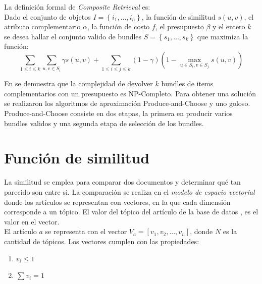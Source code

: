 La definición formal de \textit{Composite Retrieval} es:\\
Dado el conjunto de objetos $I = \left\{i_1, \ldots, i_n \right\}$, la función de similitud $s(u,v)$, el atributo complementario $\alpha$, la función de costo $f$, el presupuesto $\beta$ y el entero $k$ se desea hallar el conjunto valido de bundles $S = \left\{s_1, \ldots, s_k\right\}$ que maximiza la función:
\begin{equation} \label{des:eq-fnObj}
  \sum_{1 \leq i \leq k}{\sum_{u,v \in S_i}{\gamma s(u,v)}} + \sum_{1 \leq i \leq j \leq k}{(1-\gamma) (1-\max_{u \in S_i, v \in S_j}{s(u,v)})}
\end{equation}

En \cite{compositeRetrival} se demuestra que la complejidad de devolver $k$ bundles de items complementarios con un presupuesto es NP-Completo. Para obtener una solución se realizaron los algoritmos de aproximación Produce-and-Choose y uno goloso. Produce-and-Choose consiste en dos etapas, la primera en producir varios bundles validos y una segunda etapa de selección de los bundles.

\section{Función de similitud}
La similitud se emplea para comparar dos documentos y determinar qué tan parecido son entre si. La comparación se realiza en el \textit{modelo de espacio vectorial} donde los artículos se representan con vectores, en la que cada dimensión corresponde a un tópico. El valor del tópico del artículo de la base de datos \cite{dataDrive}, es el valor en el vector.\\
El artículo $a$ se representa con el vector $V_a = [v_1,v_2,...,v_n]$, donde $N$ es la cantidad de tópicos. Los vectores cumplen con las propiedades:
\begin{enumerate}
 \item $v_i \leqslant 1$
 \item $\sum{v_i} = 1$
\end{enumerate}

